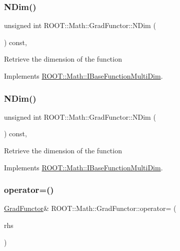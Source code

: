 \subsubsection{\texorpdfstring{NDim()}{NDim()}\hspace{0.1cm}{\footnotesize\ttfamily [1/2]}}
{\footnotesize\ttfamily unsigned int R\+O\+O\+T\+::\+Math\+::\+Grad\+Functor\+::\+N\+Dim (\begin{DoxyParamCaption}{ }\end{DoxyParamCaption}) const\hspace{0.3cm}{\ttfamily [inline]}, {\ttfamily [virtual]}}

Retrieve the dimension of the function 

Implements \mbox{\hyperlink{classROOT_1_1Math_1_1IBaseFunctionMultiDim_a16f37dc7a6d00c75ddeda0697741315d}{R\+O\+O\+T\+::\+Math\+::\+I\+Base\+Function\+Multi\+Dim}}.

\mbox{\label{classROOT_1_1Math_1_1GradFunctor_a7ff4ed4ad6f7c17d74403a443990f069}} 
\subsubsection{\texorpdfstring{NDim()}{NDim()}\hspace{0.1cm}{\footnotesize\ttfamily [2/2]}}
{\footnotesize\ttfamily unsigned int R\+O\+O\+T\+::\+Math\+::\+Grad\+Functor\+::\+N\+Dim (\begin{DoxyParamCaption}{ }\end{DoxyParamCaption}) const\hspace{0.3cm}{\ttfamily [inline]}, {\ttfamily [virtual]}}

Retrieve the dimension of the function 

Implements \mbox{\hyperlink{classROOT_1_1Math_1_1IBaseFunctionMultiDim_a16f37dc7a6d00c75ddeda0697741315d}{R\+O\+O\+T\+::\+Math\+::\+I\+Base\+Function\+Multi\+Dim}}.

\mbox{\label{classROOT_1_1Math_1_1GradFunctor_a7f7a0c6b466d283cb6085f0e57ab1e6a}} 
\subsubsection{\texorpdfstring{operator=()}{operator=()}\hspace{0.1cm}{\footnotesize\ttfamily [1/2]}}
{\footnotesize\ttfamily \mbox{\hyperlink{classROOT_1_1Math_1_1GradFunctor}{Grad\+Functor}}\& R\+O\+O\+T\+::\+Math\+::\+Grad\+Functor\+::operator= (\begin{DoxyParamCaption}\item[{const \mbox{\hyperlink{classROOT_1_1Math_1_1GradFunctor}{Grad\+Functor}} \&}]{rhs }\end{DoxyParamCaption})\hspace{0.3cm}{\ttfamily [inline]}}

